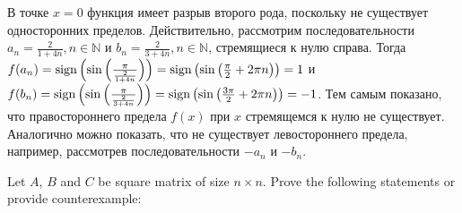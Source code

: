 \documentclass[addpoints, answers]{exam} %
\begin{document}
\begin{questions}
\begin{solution}
В точке $x=0$ функция имеет разрыв второго рода, поскольку не существует односторонних пределов. Действительно, рассмотрим последовательности $a_n = \frac{2}{1+4 n}, n
\in \mathbb{N}$ и $b_n = \frac{2}{3+4 n}, n \in \mathbb{N}$, стремящиеся к нулю справа. Тогда $f(a_n) = {\operatorname{sign}} \left(\sin \left( \frac{\pi}{\frac{2}{1+4 n}}\right)\right) = {\operatorname{sign}} \left( \sin \left( \frac{\pi}{2} + 2 \pi n \right)\right)=1$ и $f(b_n) = {\operatorname{sign}} \left(\sin \left( \frac{\pi}{\frac{2}{3+4 n}}\right)\right) = {\operatorname{sign}} \left( \sin \left( \frac{3 \pi}{2} + 2 \pi n \right)\right)=-1$. Тем самым показано, что правостороннего предела $f(x)$ при $x$ стремящемся к нулю не существует. Аналогично можно показать, что не существует левостороннего предела, например, рассмотрев последовательности $-a_n$ и $-b_n$.
\end{solution}





\question Let $A$, $B$ and $C$ be square matrix of size $n\times n$. Prove the following statements or provide counterexample:

\end{questions}
\end{document}
